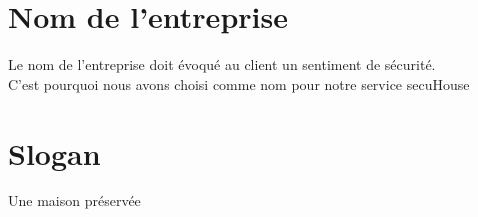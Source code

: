 \documentclass[a4paper,12pt]{article}
\begin{document}
\section{Nom de l'entreprise}
Le nom de l'entreprise doit évoqué au client un sentiment de sécurité.\\
C'est pourquoi nous avons choisi comme nom pour notre service secuHouse

\section{Slogan}
Une maison préservée
\end{document}

